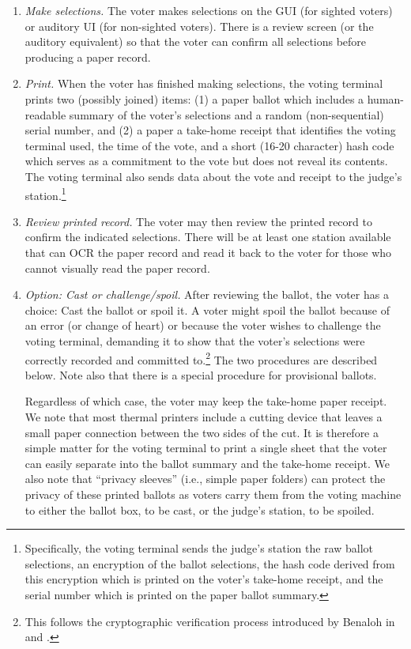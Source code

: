 \documentclass[letterpaper, 10pt, twocolumn]{article}
\begin{document}
\begin{enumerate}
\item {\em Make selections.}
 The voter makes selections on the GUI (for sighted voters)
 or auditory UI (for non-sighted voters).
 There is a review screen (or the auditory equivalent)
 so that the voter can confirm all selections before producing a paper record.

\item {\em Print.} When the voter has finished making selections,
  the voting terminal prints two (possibly joined) items:
  (1) a paper ballot which includes a human-readable summary of the voter's selections
  and a random (non-sequential) serial number, and
  (2) a paper a take-home receipt that identifies the voting terminal used, the
  time of the vote, and a short (16-20 character) hash code which
  serves as a commitment to the vote but does not reveal its contents.
  The voting terminal also sends data about the vote and receipt
  to the judge's station.\footnote{
  Specifically, the voting terminal sends the judge's station
  the raw ballot selections, an encryption of the ballot selections,
  the hash code derived from this encryption
  which is printed on the voter's take-home receipt,
  and the serial number which is printed on the paper ballot summary.} 


 


\item {\em Review printed record.}
The voter may then review the printed record to confirm the indicated selections. There will be at least one station available that can OCR the paper record and read it back to the voter for those who cannot visually read the paper record.

\item {\em Option: Cast or challenge/spoil.}
After reviewing the ballot, the voter has a choice: Cast the ballot or spoil it.
 A voter might spoil the ballot because of an error (or change of heart)
 or because the voter wishes to challenge the voting terminal, demanding it to show
 that the voter's selections were correctly recorded and committed to.\footnote{
 This follows the cryptographic verification process introduced by Benaloh
 in \cite{benaloh06simple} and \cite{benaloh07evt}.}
 The two procedures are described below. Note also that there is a special procedure for provisional ballots.

 Regardless of which case, the voter may keep the take-home paper receipt.
 We note that most thermal printers include a cutting device that leaves a
 small paper connection between the two sides of the cut.
 It is therefore a simple matter for the voting terminal to print a single
 sheet that the voter can easily separate into the ballot summary and the
 take-home receipt.
 We also note that ``privacy sleeves'' (i.e., simple paper folders) can protect the privacy of these printed ballots as voters carry them from the voting machine to either the ballot box, to be cast, or the judge's station, to be spoiled.


\end{enumerate}
\end{document}
